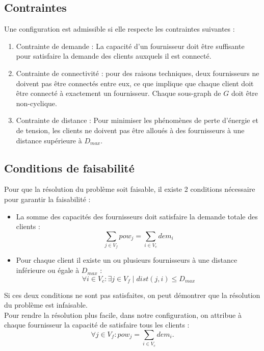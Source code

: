 \documentclass[12pt,a4paper]{article}
\begin{document}
\begin{multicols}{2}
\subsection{Contraintes}
Une configuration est admissible si elle respecte les contraintes suivantes :
\begin{enumerate}
\item Contrainte de demande : La capacité d'un fournisseur doit être suffisante pour satisfaire la demande des clients auxquels il est connecté.
\item Contrainte de connectivité : pour des raisons techniques, deux fournisseurs ne doivent pas être connectés entre eux, ce que implique que chaque client doit être connecté à exactement un fournisseur. Chaque sous-graph de $G$ doit être non-cyclique.
\item Contrainte de distance : Pour minimiser les phénomènes de perte d'énergie et de tension, les clients ne doivent pas être alloués à des fournisseurs à une distance supérieure à $D_{max}$.   
\end{enumerate}
\subsection{Conditions de faisabilité}
Pour que la résolution du problème soit faisable, il existe 2 conditions nécessaire pour garantir la faisabilité :
\begin{itemize}
\item La somme des capacités des fournisseurs doit satisfaire la demande totale des clients : \begin{equation*}
\sum_{j \in V_{f}}{pow_{j}}  = \sum_{i \in V_{c}}{dem_{i}}
\end{equation*}
\item Pour chaque client il existe un ou plusieurs fournisseurs à une distance inférieure ou égale à $D_{max}$ :
\begin{equation*}
\forall i \in V_{c} :  \exists j \in V_{f} \mid dist(j,i) \leq D_{max}
\end{equation*}
\end{itemize}
Si ces deux conditions ne sont pas satisfaites, on peut démontrer que la résolution du problème est infaisable.\\
Pour rendre la résolution plus facile, dans notre configuration, on attribue à chaque fournisseur la capacité de satisfaire tous les clients : 
\begin{equation*}
\forall j \in V_{f} : pow_{j}=\sum_{i \in V_{c}}{dem_{i}}.
\end{equation*}

\end{multicols}
\end{document}
